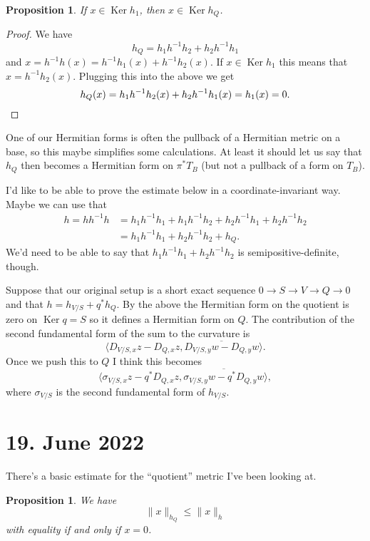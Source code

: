 \documentclass[11pt]{article}
\newtheorem{prop}[theo]{Proposition}
\theoremstyle{definition}
\def\ov#1{\overline{#1}}
\DeclareMathOperator{\Ker}{Ker}
\begin{document}
\begin{prop}
If $x \in \Ker h_{1}$, then $x \in \Ker h_{Q}$.
\end{prop}

\begin{proof}
We have
\[
h_{Q} = h_{1} h^{-1} h_{2} + h_{2} h^{-1} h_{1}
\]
and $x = h^{-1}h(x) = h^{-1}h_{1}(x) + h^{-1}h_{2}(x)$. If $x \in \Ker h_{1}$ this means that $x = h^{-1}h_{2}(x)$. Plugging this into the above we get
\[
h_{Q}(x)
= h_{1} h^{-1} h_{2}(x) + h_{2} h^{-1} h_{1}(x)
= h_{1}(x) = 0.
\qedhere
\]
\end{proof}

One of our Hermitian forms is often the pullback of a Hermitian metric on a base, so this maybe simplifies some calculations. At least it should let us say that $h_{Q}$ then becomes a Hermitian form on $\pi^{*}T_{B}$ (but not a pullback of a form on $T_{B}$).

I'd like to be able to prove the estimate below in a coordinate-invariant way. Maybe we can use that
\begin{align*}
h
= hh^{-1}h
&= h_{1}h^{-1}h_{1}
+ h_{1}h^{-1}h_{2}
+ h_{2}h^{-1}h_{1}
+ h_{2}h^{-1}h_{2}
\\
&= h_{1}h^{-1}h_{1}
+ h_{2}h^{-1}h_{2}
+ h_{Q}.
\end{align*}
We'd need to be able to say that $h_{1}h^{-1}h_{1} + h_{2}h^{-1}h_{2}$ is semipositive-definite, though.


Suppose that our original setup is a short exact sequence $0 \to S \to V \to Q \to 0$ and that $h = h_{V/S} + q^{*} h_{Q}$. By the above the Hermitian form on the quotient is zero on $\Ker q = S$ so it defines a Hermitian form on $Q$. The contribution of the second fundamental form of the sum to the curvature is
\[
\langle D_{V/S,x} z - D_{Q,x}z, \ov{D_{V/S,y}w - D_{Q,y}w} \rangle.
\]
Once we push this to $Q$ I think this becomes
\[
\langle \sigma_{V/S,x} z - q^{*}D_{Q,x}z, \ov{\sigma_{V/S,y}w - q^{*}D_{Q,y}w} \rangle,
\]
where $\sigma_{V/S}$ is the second fundamental form of $h_{V/S}$.


\section*{19. June 2022}

There's a basic estimate for the ``quotient'' metric I've been looking at.

\begin{prop}
  We have
  \[
    \|x\|_{h_{Q}} \leq \| x \|_{h}
  \]
  with equality if and only if $x = 0$.
\end{prop}
\end{document}
